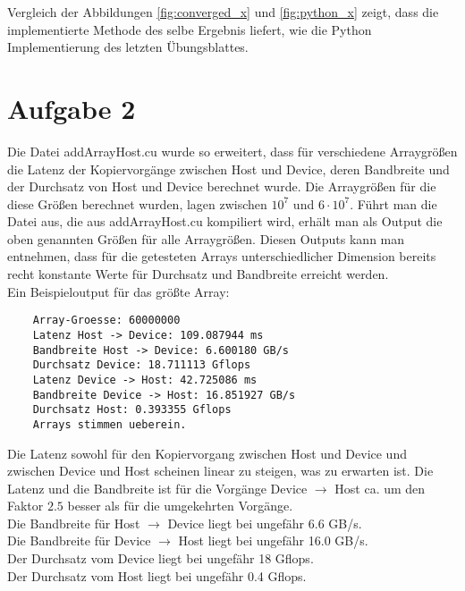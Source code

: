 \documentclass[10pt,a4paper]{article}
\begin{document}
Vergleich der Abbildungen \ref{fig:converged_x} und \ref{fig:python_x} zeigt,
dass die implementierte Methode des selbe Ergebnis liefert, wie die Python
Implementierung des letzten Übungsblattes.

\section{Aufgabe 2}
	
	Die Datei addArrayHost.cu wurde so erweitert, dass für verschiedene Arraygrößen
	die Latenz der Kopiervorgänge zwischen Host und Device, deren Bandbreite und 
	der Durchsatz von Host und Device berechnet wurde. Die Arraygrößen für die 
	diese Größen berechnet wurden, lagen zwischen $10^{7}$ und $6 \cdot 10^{7}$.
	Führt man die Datei aus, die aus addArrayHost.cu kompiliert wird, erhält man
	als Output die oben genannten Größen für alle Arraygrößen. Diesen Outputs kann
	man entnehmen, dass für die getesteten Arrays unterschiedlicher Dimension
	bereits recht konstante Werte für Durchsatz und Bandbreite erreicht werden.\\
	Ein Beispieloutput für das größte Array:

	\begin{verbatim}
	Array-Groesse: 60000000
	Latenz Host -> Device: 109.087944 ms
	Bandbreite Host -> Device: 6.600180 GB/s
	Durchsatz Device: 18.711113 Gflops 
	Latenz Device -> Host: 42.725086 ms
	Bandbreite Device -> Host: 16.851927 GB/s
	Durchsatz Host: 0.393355 Gflops 
	Arrays stimmen ueberein.
	\end{verbatim}
 
	Die Latenz sowohl für den Kopiervorgang zwischen Host und Device und zwischen 
	Device und Host scheinen linear zu steigen, was zu erwarten ist. Die Latenz und die Bandbreite
	ist für die Vorgänge Device $\rightarrow$ Host ca. um den Faktor $2.5$ besser als für die umgekehrten
	Vorgänge.\\
	Die Bandbreite für Host $\rightarrow$ Device liegt bei ungefähr 6.6 GB/s.\\
	Die Bandbreite für Device  $\rightarrow$ Host liegt bei ungefähr 16.0 GB/s.\\
	Der Durchsatz vom Device liegt bei ungefähr 18 Gflops.\\
	Der Durchsatz vom Host liegt bei ungefähr 0.4 Gflops.\\
\end{document}
